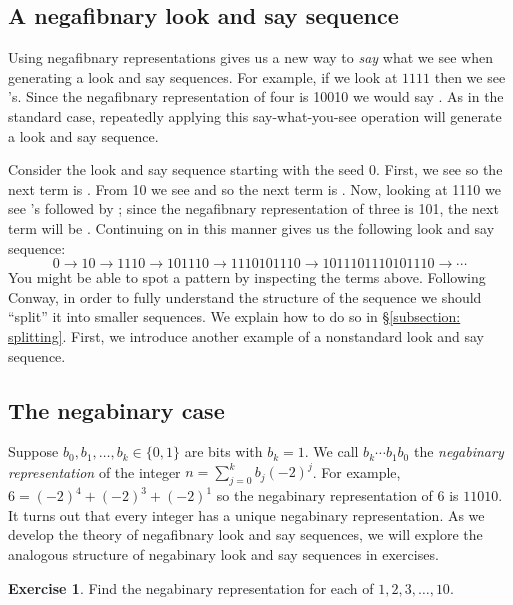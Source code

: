 \documentclass[reqno]{amsart}
\theoremstyle{definition}
\newtheorem{exercise}[theorem]{Exercise}
\newcommand{\red}[1]{{\color{red}{#1}}}
\newcommand{\blue}[1]{{\color{blue}{#1}}}
\begin{document}
\subsection{A negafibnary look and say sequence}\label{subsection: negative Zeckendorf las}
Using negafibnary representations gives us a new way to \emph{say} what we see when generating a look and say sequences. For example, if we look at $1111$ then we see \red{four} \blue{1}'s. Since the negafibnary representation of four is 10010 we would say \red{10010}\blue{1}. As in the standard case, repeatedly applying this say-what-you-see operation will generate a look and say sequence. 

Consider the look and say sequence starting with the seed 0. First, we see \red{one} \blue{0} so the next term is \red{1}\blue{0}. From 10 we see \red{one} \blue{1} and \red{one} \blue{0} so the next term is \red{1}\blue{1}\red{1}\blue{0}. Now, looking at 1110 we see \red{three} \blue{1}'s followed by \red{one} \blue{0}; since the negafibnary representation of three is 101, the next term will be \red{101}\blue{1}\red{1}\blue{0}. Continuing on in this manner gives us the following look and say sequence:
\begin{equation}\label{equation: negafibnary las with seed 0}
    0\to 10\to 1110\to 101110\to 1110101110\to 1011101110101110\to\cdots
\end{equation}
You might be able to spot a pattern by inspecting the terms above. Following Conway, in order to fully understand the structure of the sequence we should ``split'' it into smaller sequences. We explain how to do so in \S\ref{subsection: splitting}. First, we introduce another example of a nonstandard look and say sequence. 

\subsection{The negabinary case}\label{subsection: negabinary}
Suppose $b_0,b_1,\ldots,b_k\in\{0,1\}$ are bits with $b_k=1$. We call $b_k\cdots b_1b_0$ the \emph{negabinary representation} of the integer $n=\sum\limits_{j=0}^kb_j(-2)^j$. For example, $6=(-2)^4+(-2)^3+(-2)^1$ so the negabinary representation of $6$ is $11010$. It turns out that every integer has a unique negabinary representation. As we develop the theory of negafibnary look and say sequences, we will explore the analogous structure of negabinary look and say sequences in exercises. 

\begin{exercise}
    Find the negabinary representation for each of $1, 2, 3,\ldots, 10$.
\end{exercise}
\end{document}
